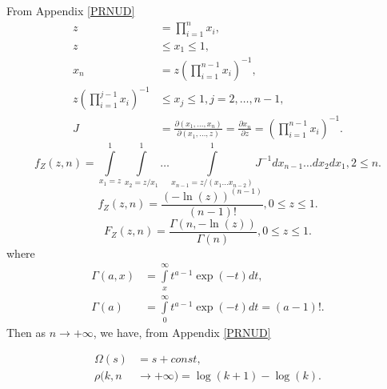 \documentclass[titlepage,fleqn]{article}%
\begin{document}
\label{PnNfUD}%


From Appendix
\ref{PRNUD}%
\begin{align*}
z  &  =%
{\displaystyle\prod\limits_{i=1}^{n}}
x_{i},\\
z  &  \leq x_{1}\leq1,\\
x_{n}  &  =z\left(
{\displaystyle\prod\limits_{i=1}^{n-1}}
x_{i}\right)  ^{-1},\\
z\left(
{\displaystyle\prod\limits_{i=1}^{j-1}}
x_{i}\right)  ^{-1}  &  \leq x_{j}\leq1,j=2,\ldots,n-1,\\
J  &  =\frac{\partial(x_{1},\ldots,x_{n})}{\partial(x_{1},\ldots,z)}%
=\frac{\partial x_{n}}{\partial z}=\left(
{\displaystyle\prod\limits_{i=1}^{n-1}}
x_{i}\right)  ^{-1}.
\end{align*}%
\[
f_{Z}(z,n)=%
{\displaystyle\int\limits_{x_{1}=z}^{1}}
{\displaystyle\int\limits_{x_{2}=z/x_{1}}^{1}}
\ldots%
{\displaystyle\int\limits_{x_{n-1}=z/\left(  x_{1}\ldots x_{n-2}\right)  }%
^{1}}
J^{-1}dx_{n-1}\ldots dx_{2}dx_{1},2\leq n.
\]%
\[
f_{Z}(z,n)=\frac{(-\ln(z))^{(n-1)}}{(n-1)!},0\leq z\leq1.
\]%
\[
F_{Z}(z,n)=\frac{\Gamma(n,-\ln(z))}{\Gamma(n)},0\leq z\leq1.
\]
where%
\begin{align*}
\Gamma(a,x)  &  =%
{\displaystyle\int\limits_{x}^{\infty}}
t^{a-1}\exp(-t)dt,\\
\Gamma(a)  &  =%
{\displaystyle\int\limits_{0}^{\infty}}
t^{a-1}\exp(-t)dt=(a-1)!.
\end{align*}
Then as $n\rightarrow+\infty$, we have, from Appendix
\ref{PRNUD}%
%

\begin{align*}
\Omega\left(  s\right)   &  =s+const,\\
\rho(k,n  &  \rightarrow+\infty)=\log(k+1)-\log(k).
\end{align*}
\end{document}
